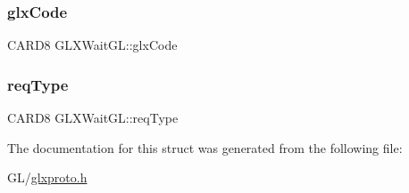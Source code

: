 \mbox{\label{struct_g_l_x_wait_g_l_ad78bf34fd2e16e1215641c0793947e7d}} 
\subsubsection{\texorpdfstring{glx\+Code}{glxCode}}
{\footnotesize\ttfamily C\+A\+R\+D8 G\+L\+X\+Wait\+G\+L\+::glx\+Code}

\mbox{\label{struct_g_l_x_wait_g_l_a96be1b4c9e3332f296ccb2bef4954457}} 
\subsubsection{\texorpdfstring{req\+Type}{reqType}}
{\footnotesize\ttfamily C\+A\+R\+D8 G\+L\+X\+Wait\+G\+L\+::req\+Type}



The documentation for this struct was generated from the following file\+:\begin{DoxyCompactItemize}
\item 
G\+L/\hyperlink{glxproto_8h}{glxproto.\+h}\end{DoxyCompactItemize}
